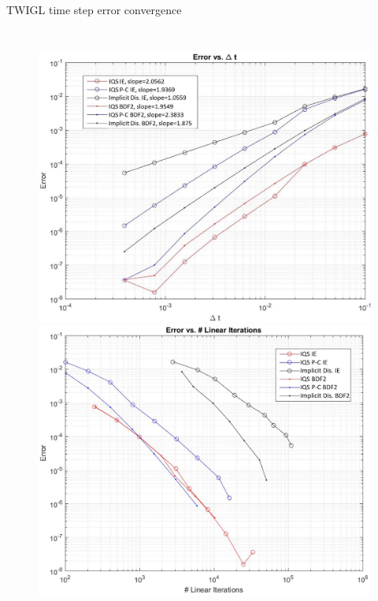 \documentclass[8pt,xcolor=dvipnames]{beamer}
\begin{document}
\begin{frame}{TWIGL time step error convergence}

\begin{columns}
\column{\dimexpr\paperwidth-10pt}
\begin{figure}
\includegraphics[width=0.5\linewidth]{figures/TWIGL_convergence.jpg}
\includegraphics[width=0.5\linewidth]{figures/TWIGL_ramp_lin.png}
\end{figure}
\end{columns}

\end{frame}
\end{document}
